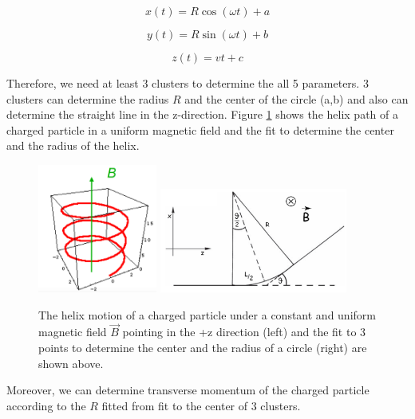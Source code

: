 \begin{equation}
x(t) = R \cos(\omega t) + a
\end{equation}

\begin{equation}
y(t) = R \sin(\omega t) + b
\end{equation}

\begin{equation}
z(t) = v t + c
\end{equation}

Therefore, we need at least 3 clusters to determine the all 5 parameters. 3 clusters can determine the radius $R$ and the center of the circle (a,b) and also can determine the straight line in the z-direction. Figure \ref{HelixAndFit} shows the helix path of a charged particle in a uniform magnetic field and the fit to determine the center and the radius of the helix.


\begin{figure}[hbtp]
\begin{center}
\includegraphics[width=0.35\textwidth]{Figures/Chapter3/Helix.png}
\includegraphics[width=0.55\textwidth]{Figures/Chapter3/FitToCircle.png}
\caption{The helix motion of a charged particle under a constant and uniform magnetic field $\vec{B}$ pointing in the +z direction (left) and the fit to 3 points to determine the center and the radius of a circle (right) are shown above.}
\label{HelixAndFit}
\end{center}
\end{figure} 

Moreover, we can determine transverse momentum of the charged particle according to the $R$ fitted from fit to the center of 3 clusters.

